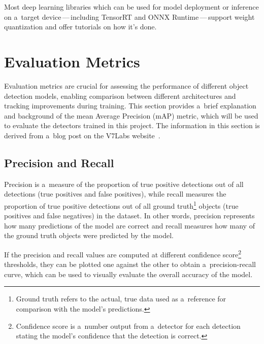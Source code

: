 
Most deep learning libraries which can be used for model deployment or inference
on a~target device\,---\,including TensorRT and ONNX Runtime\,---\,support
weight quantization and offer tutorials on how it's done.



\section{Evaluation Metrics}
\label{EvaluationMetrics}

Evaluation metrics are crucial for assessing the performance of different object
detection models, enabling comparison between different architectures and
tracking improvements during training. This section provides a~brief
explanation and background of the mean Average Precision (mAP) metric, which
will be used to evaluate the detectors trained in this project. The information
in this section is derived from a~blog post on the V7Labs website~\cite{mAP}.

\subsection*{Precision and Recall}

Precision is a~measure of the proportion of true positive detections out of all
detections (true positives and false positives), while recall measures the
proportion of true positive detections out of all ground truth\footnote{Ground
truth refers to the actual, true data used as a~reference for comparison with
the model's predictions.} objects (true positives and false negatives) in the
dataset. In other words, precision represents how many predictions of the model are
correct and recall measures how many of the ground truth objects were predicted
by the model.

If the precision and recall values are computed at different confidence
score\footnote{Confidence score is a~number output from a~detector for each
detection stating the model's confidence that the detection is correct.}
thresholds, they can be plotted one against the other to obtain
a~precision-recall curve, which can be used to visually evaluate the overall
accuracy of the model.

